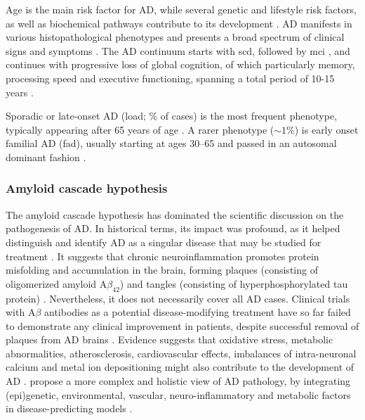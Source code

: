 \documentclass{amsart}
\begin{document}
Age is the main risk factor for AD, while several genetic and lifestyle risk factors, as well as biochemical pathways contribute to its development \cite{Penke2023NewDisease}. AD manifests in various histopathological phenotypes and presents a broad spectrum of clinical signs and symptoms \cite{Heneka2015NeuroinflammationDisease, Edwards2019ANeurodegeneration}. The AD continuum starts with \acrfull{scd}, followed by \acrfull{mci} \cite*{AALDIJK2022101556}, and continues with progressive loss of global cognition, of which particularly memory, processing speed and executive functioning, spanning a total period of 10-15 years \cite{Scheltens2016AlzheimersDisease}. 

Sporadic or late-onset AD (\acrshort{load}; \% of cases) is the most frequent phenotype, typically appearing after 65 years of age \cite{Beydoun2014EpidemiologicMeta-analysis}. A rarer phenotype ($\sim1\%$) is early onset familial AD (\acrshort{fad}), usually starting at ages 30–65 and passed in an autosomal dominant fashion \cite{VanCauwenberghe2015ThePerspectives}.

\subsubsection{Amyloid cascade hypothesis}
The amyloid cascade hypothesis has dominated the scientific discussion on the pathogenesis of AD. In historical terms, its impact was profound, as it helped distinguish and identify AD as a singular disease that may be studied for treatment \cite{Hardy2006AlzheimersReappraisal}. It suggests that chronic neuroinflammation promotes protein misfolding and accumulation in the brain, forming plaques (consisting of oligomerized amyloid A$\beta_{42}$) and tangles (consisting of hyperphosphorylated tau protein) \cite{Edwards2019ANeurodegeneration}. Nevertheless, it does not necessarily cover all AD cases. Clinical trials with A$\beta$ antibodies as a potential disease-modifying treatment have so far failed to demonstrate any clinical improvement in patients, despite successful removal of plaques from AD brains \cite{Kepp2023TheReview,Kurkinen2023TheThinking}. Evidence suggests that oxidative stress, metabolic abnormalities, atherosclerosis, cardiovascular effects, imbalances of intra-neuronal calcium and metal ion depositioning might also contribute to the development of AD \cite{Kepp2023TheReview}. \citeauthor{Kepp2023TheReview} propose a more complex and holistic view of AD pathology, by integrating (epi)genetic, environmental, vascular, neuro-inflammatory and metabolic factors in disease-predicting models \cite{Kepp2023TheReview}.
\end{document}
